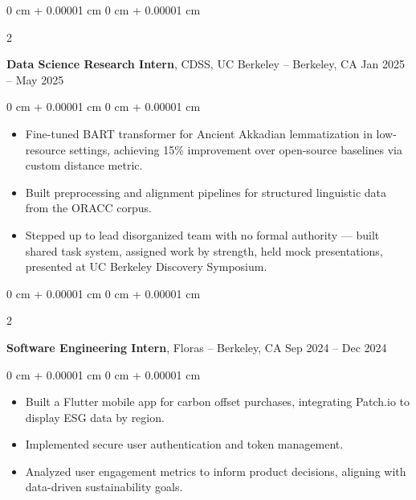 \documentclass[10pt, letterpaper]{article}
\newenvironment{highlights}{
    \begin{itemize}[
        topsep=0.3 cm,
        parsep=0.05 cm,
        partopsep=0pt,
        itemsep=0pt, 
        leftmargin=0 cm + 10pt
    ]
}{
    \end{itemize}
} %
\newenvironment{onecolentry}{
    \begin{adjustwidth}{
        0 cm + 0.00001 cm
    }{
        0 cm + 0.00001 cm
    }
}{
    \end{adjustwidth}
} %
\newenvironment{twocolentry}[2][]{
    \onecolentry
    \def\secondColumn{#2}
    \setcolumnwidth{\fill, 4.5 cm}
    \begin{paracol}{2}
}{
    \switchcolumn \raggedleft \secondColumn
    \end{paracol}
    \endonecolentry
} %
\begin{document}
        \vspace{0.07 cm}

        \begin{twocolentry}{
            Jan 2025 – May 2025
        }
            \textbf{Data Science Research Intern}, CDSS, UC Berkeley -- Berkeley, CA\end{twocolentry}

        \vspace{0.07 cm}
        \begin{onecolentry}
            \begin{highlights}
                \item Fine-tuned BART transformer for Ancient Akkadian lemmatization in low-resource settings, achieving 15\% improvement over open-source baselines via custom distance metric.
                \item Built preprocessing and alignment pipelines for structured linguistic data from the ORACC corpus.
                \item Stepped up to lead disorganized team with no formal authority — built shared task system, assigned work by strength, held mock presentations, presented at UC Berkeley Discovery Symposium.
            \end{highlights}
       \end{onecolentry}

        \vspace{0.07 cm}

        \begin{twocolentry}{
            Sep 2024 – Dec 2024
        }
            \textbf{Software Engineering Intern}, Floras -- Berkeley, CA\end{twocolentry}

        \vspace{0.07 cm}
        \begin{onecolentry}
            \begin{highlights}
                \item Built a Flutter mobile app for carbon offset purchases, integrating Patch.io to display ESG data by region.
                \item Implemented secure user authentication and token management.
                \item Analyzed user engagement metrics to inform product decisions, aligning with data-driven sustainability goals.
            \end{highlights}
        \end{onecolentry}
\end{document}
